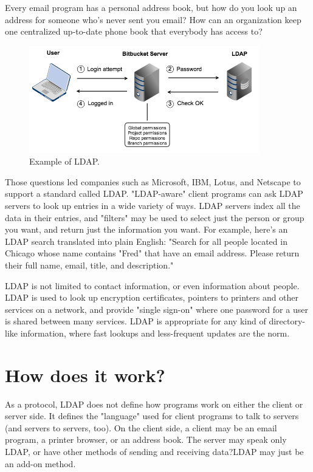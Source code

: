 \documentclass[12pt,a4paper]{report}
\begin{document}
	Every email program has a personal address book, but how do you look up an address for someone who's never sent you email? How can an organization keep one centralized up-to-date phone book that everybody has access to?
		\begin{figure}[h]
			\centering
			\includegraphics[width=10cm]{LDAP.png}
			\caption{Example of LDAP.}
		\end{figure}
	Those questions led companies such as Microsoft, IBM, Lotus, and Netscape to support a standard called LDAP. "LDAP-aware" client programs can ask LDAP servers to look up entries in a wide variety of ways. LDAP servers index all the data in their entries, and "filters" may be used to select just the person or group you want, and return just the information you want. For example, here's an LDAP search translated into plain English: "Search for all people located in Chicago whose name contains "Fred" that have an email address. Please return their full name, email, title, and description."
	
	LDAP is not limited to contact information, or even information about people. LDAP is used to look up encryption certificates, pointers to printers and other services on a network, and provide "single sign-on" where one password for a user is shared between many services. LDAP is appropriate for any kind of directory-like information, where fast lookups and less-frequent updates are the norm.
	
	\section{How does it work?}
	As a protocol, LDAP does not define how programs work on either the client or server side. It defines the "language" used for client programs to talk to servers (and servers to servers, too). On the client side, a client may be an email program, a printer browser, or an address book. The server may speak only LDAP, or have other methods of sending and receiving data?LDAP may just be an add-on method.
	
\end{document}
